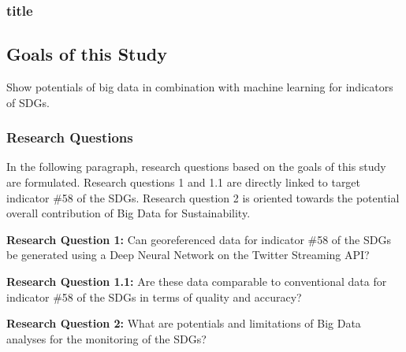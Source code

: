 			\subsubsection{title}
			
			
			
		\subsection{Goals of this Study}
		
		Show potentials of big data in combination with machine learning for indicators of SDGs.
		
		
		
			\subsubsection{Research Questions}
			
			In the following paragraph, research questions based on the goals of this study are formulated. Research questions 1 and 1.1 are directly linked to target indicator \#58 of the SDGs. Research question 2 is oriented towards the potential overall contribution of Big Data for Sustainability.
			
			\bigbreak
			
			\begin{tcolorbox}
				\textbf{Research Question 1:} \smallbreak Can georeferenced data for indicator \#58 of the SDGs be generated using a Deep Neural Network on the Twitter Streaming API?
			\end{tcolorbox}
			
			\bigbreak
				
				\begin{tcolorbox}
					\textbf{Research Question 1.1:} \smallbreak Are these data comparable to conventional data for indicator \#58 of the SDGs in terms of quality and accuracy?
				\end{tcolorbox}
				
			\bigbreak
				
				\begin{tcolorbox}
					\textbf{Research Question 2:} \smallbreak What are potentials and limitations of Big Data analyses for the monitoring of the SDGs?
				\end{tcolorbox}

			\bigbreak
				
	
			